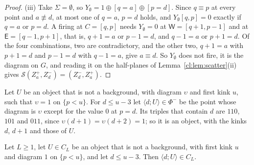 \begin{proof}
(iii) Take $\Sigma=\emptyset$, so $Y_\emptyset=1\oplus[q=a]\oplus[p=d]$. Since $q\equiv p$ at every point and $a\not\equiv d$, at most one of $q=a$, $p=d$ holds, and $Y_\emptyset[q,p]=0$ exactly if $q=a$ or $p=d$. A firing at $C=[q,p]$ needs $Y_\emptyset=0$ at $\mathsf W=[q+1,p-1]$ and at $\mathsf E=[q-1,p+1]$, that is, $q+1=a$ or $p-1=d$, and $q-1=a$ or $p+1=d$. Of the four combinations, two are contradictory, and the other two, $q+1=a$ with $p+1=d$ and $p-1=d$ with $q-1=a$, give $a\equiv d$. So $Y_\emptyset$ does not fire, it is the diagram on $G$, and reading it on the half-planes of Lemma~\ref{cl:lem:scatter}(ii) gives $\mathcal S(Z^+_a,Z^-_d)=(Z^-_d,Z^+_a)$.
\end{proof}

Let $U$ be an object that is not a background, with diagram $\upsilon$ and first kink $u$, such that $\upsilon=1$ on $\{p<u\}$. For $d\le u-3$ let $\langle d;U\rangle\in\Phi^-$ be the point whose diagram is $\upsilon$ except for the value $0$ at $p=d$. Its triples that contain $d$ are $110$, $101$ and $011$, since $\upsilon(d+1)=\upsilon(d+2)=1$; so it is an object, with the kinks $d$, $d+1$ and those of $U$.

\begin{lemma}\label{cl:lem:prependZ}
Let $L\ge1$, let $U\in C_L$ be an object that is not a background, with first kink $u$ and diagram $1$ on $\{p<u\}$, and let $d\le u-3$. Then $\langle d;U\rangle\in C_L$.
\end{lemma}

